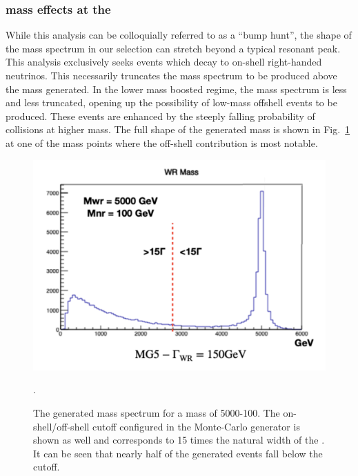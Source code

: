 \subsubsection{\WRNR mass effects at the \LHC}
While this analysis can be colloquially referred to as a ``bump hunt'', the shape of the \WR mass spectrum in our selection can stretch beyond a typical resonant peak. This analysis exclusively seeks \WR events which decay to on-shell right-handed neutrinos. This necessarily truncates the \WR mass spectrum to be produced above the \NR mass generated. In the lower \NR mass boosted regime, the \WR mass spectrum is less and less truncated, opening up the possibility of low-mass offshell \WR events to be produced. These events are enhanced by the steeply falling probability of collisions at higher mass. The full shape of the generated \WR mass is shown in Fig.~\ref{fig:wr_5000_100_spectrum} at one of the \WRNR mass points where the off-shell contribution is most notable.
\label{sec:WRshape}
 \begin{figure}[!btp]
    \centering
    \includegraphics[width=\textwidth]{figures/WR_5000_100_spectrum.pdf}
    \caption[\WR mass spectrum]
       {The generated mass spectrum for a \WRNR mass of 5000-100. The on-shell/off-shell cutoff configured in the Monte-Carlo generator is shown as well and corresponds to 15 times the natural width of the \WR. It can be seen that nearly half of the generated \WR events fall below the cutoff.
       }. 
    \label{fig:wr_5000_100_spectrum}
\end{figure}

